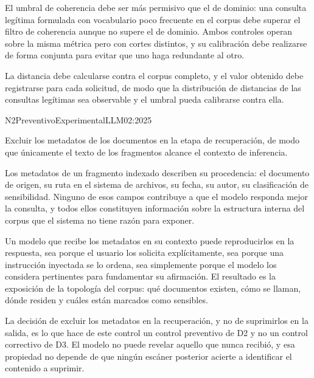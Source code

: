 El umbral de coherencia debe ser más permisivo que el de dominio: una consulta legítima formulada con vocabulario poco frecuente en el corpus debe superar el filtro de coherencia aunque no supere el de dominio. Ambos controles operan sobre la misma métrica pero con cortes distintos, y su calibración debe realizarse de forma conjunta para evitar que uno haga redundante al otro.

La distancia debe calcularse contra el corpus completo, y el valor obtenido debe registrarse para cada solicitud, de modo que la distribución de distancias de las consultas legítimas sea observable y el umbral pueda calibrarse contra ella.


  {N2}{Preventivo}{Experimental}{LLM02:2025}

Excluir los metadatos de los documentos en la etapa de recuperación, de modo que únicamente el texto de los fragmentos alcance el contexto de inferencia.

Los metadatos de un fragmento indexado describen su procedencia: el documento de origen, su ruta en el sistema de archivos, su fecha, su autor, su clasificación de sensibilidad. Ninguno de esos campos contribuye a que el modelo responda mejor la consulta, y todos ellos constituyen información sobre la estructura interna del corpus que el sistema no tiene razón para exponer.

Un modelo que recibe los metadatos en su contexto puede reproducirlos en la respuesta, sea porque el usuario los solicita explícitamente, sea porque una instrucción inyectada se lo ordena, sea simplemente porque el modelo los considera pertinentes para fundamentar su afirmación. El resultado es la exposición de la topología del corpus: qué documentos existen, cómo se llaman, dónde residen y cuáles están marcados como sensibles.

La decisión de excluir los metadatos en la recuperación, y no de suprimirlos en la salida, es lo que hace de este control un control preventivo de D2 y no un control correctivo de D3. El modelo no puede revelar aquello que nunca recibió, y esa propiedad no depende de que ningún escáner posterior acierte a identificar el contenido a suprimir.

